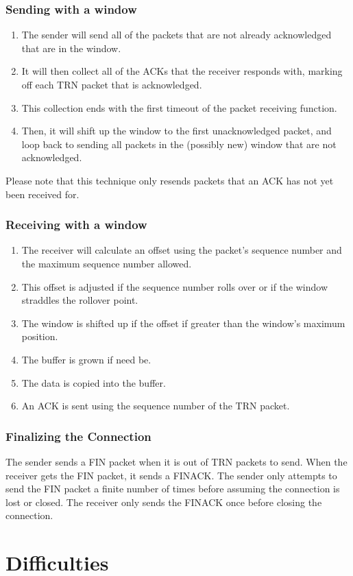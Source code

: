 \documentclass[letterpaper,twocolumn,10pt]{article}
\begin{document}
\subsubsection{Sending with a window}
\begin{enumerate}
\item The sender will send all of the packets that are not already acknowledged that are in the window.
\item It will then collect all of the ACKs that the receiver responds with, marking off each TRN packet that is acknowledged.
\item This collection ends with the first timeout of the packet receiving function.
\item Then, it will shift up the window to the first unacknowledged packet, and loop back to sending all packets in the (possibly new) window that are not acknowledged.
\end{enumerate}
Please note that this technique only resends packets that an ACK has not yet been received for.

\subsubsection{Receiving with a window}
\begin{enumerate}
\item The receiver will calculate an offset using the packet's sequence number and the maximum sequence number allowed.
\item This offset is adjusted if the sequence number rolls over or if the window straddles the rollover point.
\item The window is shifted up if the offset if greater than the window's maximum position.
\item The buffer is grown if need be.
\item The data is copied into the buffer.
\item An ACK is sent using the sequence number of the TRN packet.
\end{enumerate}

\subsubsection{Finalizing the Connection}
The sender sends a FIN packet when it is out of TRN packets to send.
When the receiver gets the FIN packet, it sends a FINACK.
The sender only attempts to send the FIN packet a finite number of times before assuming the connection is lost or closed.
The receiver only sends the FINACK once before closing the connection.

\section{Difficulties}

\theendnotes
\end{document}
